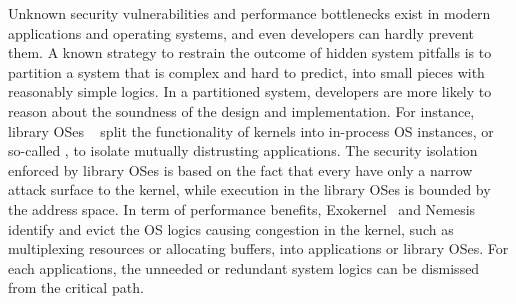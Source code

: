 Unknown security vulnerabilities and performance bottlenecks exist
in modern applications and operating systems,
and even developers can hardly prevent them.
A known strategy to restrain
the outcome of hidden system pitfalls %
is to partition a system that is complex and hard to predict,
into small pieces with reasonably simple logics.
In a partitioned system, developers
are more likely to reason about
the soundness of the design and implementation.
For instance, library OSes
~\citep{porter11drawbridge, baumann13bascule, unikernels}
split the functionality of kernels into in-process OS instances,
or so-called \term{\picoprocs{}},
to isolate mutually distrusting applications.
The security isolation enforced by library OSes
is based on the fact that
every \picoproc{} have only a narrow attack surface to the kernel,
while execution in the library OSes is
bounded by the address space.
In term of performance benefits,
Exokernel~\citep{engler95exokernel}
and Nemesis~\citep{leslie96nemesis}
identify and evict the OS logics causing congestion in the kernel,
such as multiplexing resources or allocating buffers,
into applications or library OSes.
For each applications,
the unneeded or redundant system logics can be dismissed from the critical path.






